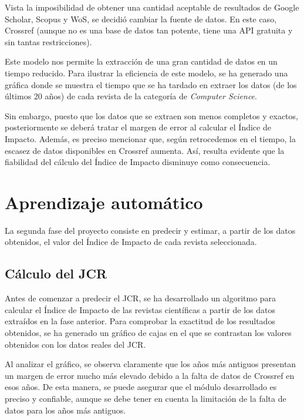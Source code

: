 Vista la imposibilidad de obtener una cantidad aceptable de resultados de Google Scholar, Scopus y WoS, se decidió cambiar la fuente de datos. En este caso, Crossref (aunque no es una base de datos tan potente, tiene una API gratuita y sin tantas restricciones).

Este modelo nos permite la extracción de una gran cantidad de datos en un tiempo reducido. Para ilustrar la eficiencia de este modelo, se ha generado una gráfica donde se muestra el tiempo que se ha tardado en extraer los datos (de los últimos 20 años) de cada revista de la categoría de \textit{Computer Science}.


Sin embargo, puesto que los datos que se extraen son menos completos y exactos, posteriormente se deberá tratar el margen de error al calcular el Índice de Impacto. Además, es preciso mencionar que, según retrocedemos en el tiempo, la escasez de datos disponibles en Crossref aumenta. Así, resulta evidente que la fiabilidad del cálculo del Índice de Impacto disminuye como consecuencia.

\section{Aprendizaje automático}
La segunda fase del proyecto consiste en predecir y estimar, a partir de los datos obtenidos, el valor del Índice de Impacto de cada revista seleccionada.

\subsection{Cálculo del JCR}
Antes de comenzar a predecir el JCR, se ha desarrollado un algoritmo para calcular el Índice de Impacto de las revistas científicas a partir de los datos extraídos en la fase anterior. Para comprobar la exactitud de los resultados obtenidos, se ha generado un gráfico de cajas en el que se contrastan los valores obtenidos con los datos reales del JCR. 


Al analizar el gráfico, se observa claramente que los años más antiguos presentan un margen de error mucho más elevado debido a la falta de datos de Crossref en esos años. De esta manera, se puede asegurar que el módulo desarrollado es preciso y confiable, aunque se debe tener en cuenta la limitación de la falta de datos para los años más antiguos.

